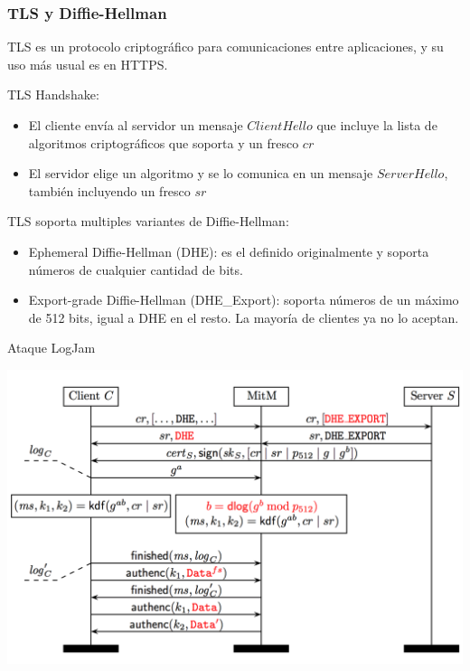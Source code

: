 \documentclass{beamer}
\begin{document}
\begin{frame}
    \frametitle{TLS y Diffie-Hellman}
    TLS es un protocolo criptográfico para comunicaciones entre aplicaciones, y su uso más usual es en HTTPS.
    
    TLS Handshake:
    \begin{itemize}
        \item<1-> El cliente envía al servidor un mensaje $ClientHello$ que incluye la lista de algoritmos criptográficos que soporta y un fresco $cr$
        \item<1-> El servidor elige un algoritmo y se lo comunica en un mensaje $ServerHello$, también incluyendo un fresco $sr$
    \end{itemize}

    TLS soporta multiples variantes de Diffie-Hellman:
    \begin{itemize}
        \item<1-> Ephemeral Diffie-Hellman (DHE): es el definido originalmente y soporta números de cualquier cantidad de bits.
        \item<1-> Export-grade Diffie-Hellman (DHE\_Export): soporta números de un máximo de 512 bits, igual a DHE en el resto. La mayoría de clientes ya no lo aceptan.
    \end{itemize}
\end{frame}

\begin{frame}{Ataque LogJam}

    \begin{center}
        \includegraphics[scale=0.5]{figure2_dh.png}
    \end{center}
\end{frame}
\end{document}
